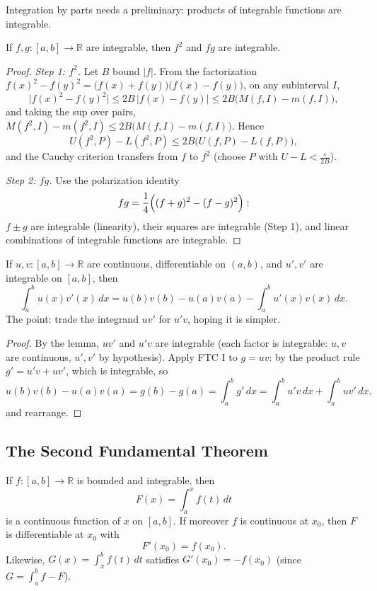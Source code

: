 \documentclass[11pt]{report}
\begin{document}
Integration by parts needs a preliminary: products of integrable functions are integrable.

\begin{lembox}
If $f, g: [a,b] \to \mathbb{R}$ are integrable, then $f^2$ and $fg$ are integrable.
\end{lembox}

\begin{proof}
\emph{Step 1: $f^2$.} Let $B$ bound $|f|$. From the factorization $f(x)^2 - f(y)^2 = \bigl(f(x)+f(y)\bigr)\bigl(f(x)-f(y)\bigr)$, on any subinterval $I$,
\[
\bigl| f(x)^2 - f(y)^2 \bigr| \leq 2B\, |f(x) - f(y)| \leq 2B\bigl( M(f,I) - m(f,I) \bigr),
\]
and taking the sup over pairs, $M(f^2, I) - m(f^2, I) \leq 2B\bigl(M(f,I) - m(f,I)\bigr)$. Hence
\[
U(f^2, P) - L(f^2, P) \leq 2B\bigl( U(f,P) - L(f,P) \bigr),
\]
and the Cauchy criterion transfers from $f$ to $f^2$ (choose $P$ with $U - L < \tfrac{\varepsilon}{2B}$).

\emph{Step 2: $fg$.} Use the polarization identity
\[
fg = \frac14\Bigl( (f+g)^2 - (f-g)^2 \Bigr):
\]
$f \pm g$ are integrable (linearity), their squares are integrable (Step 1), and linear combinations of integrable functions are integrable.
\end{proof}

\begin{thmbox}
If $u, v: [a,b] \to \mathbb{R}$ are continuous, differentiable on $(a,b)$, and $u', v'$ are integrable on $[a,b]$, then
\[
\int_a^b u(x)v'(x)\,dx = u(b)v(b) - u(a)v(a) - \int_a^b u'(x)v(x)\,dx.
\]
The point: trade the integrand $uv'$ for $u'v$, hoping it is simpler.
\end{thmbox}

\begin{proof}
By the lemma, $uv'$ and $u'v$ are integrable (each factor is integrable: $u, v$ are continuous, $u', v'$ by hypothesis). Apply FTC I to $g = uv$: by the product rule $g' = u'v + uv'$, which is integrable, so
\[
u(b)v(b) - u(a)v(a) = g(b) - g(a) = \int_a^b g'\,dx = \int_a^b u'v\,dx + \int_a^b uv'\,dx,
\]
and rearrange.
\end{proof}

\subsection{The Second Fundamental Theorem}

\begin{thmbox}
If $f: [a,b] \to \mathbb{R}$ is bounded and integrable, then
\[
F(x) = \int_a^x f(t)\,dt
\]
is a continuous function of $x$ on $[a,b]$. If moreover $f$ is continuous at $x_0$, then $F$ is differentiable at $x_0$ with
\[
F'(x_0) = f(x_0).
\]
Likewise, $G(x) = \int_x^b f(t)\,dt$ satisfies $G'(x_0) = -f(x_0)$ (since $G = \int_a^b f - F$).
\end{thmbox}
\end{document}
